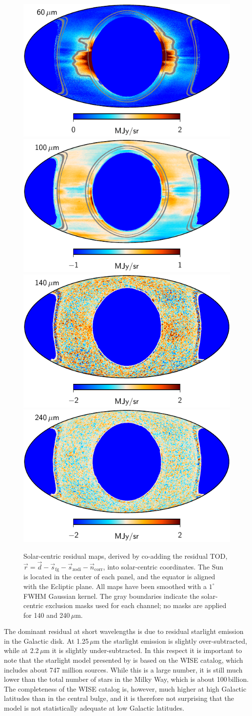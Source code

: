 \documentclass{aa}
\newcommand{\dv}[0]{\vec{d}}
\newcommand{\n}[0]{\vec{n}}
\newcommand{\s}[0]{\vec{s}}
\renewcommand{\r}[0]{\vec{r}}
\begin{document}
\begin{figure}
  \includegraphics[width=0.40\linewidth]{figs/solarmap_07_v2.pdf}\hspace*{5mm}
  \includegraphics[width=0.40\linewidth]{figs/solarmap_08_v2.pdf}\\
  \includegraphics[width=0.40\linewidth]{figs/solarmap_09_v2.pdf}\hspace*{5mm}
  \includegraphics[width=0.40\linewidth]{figs/solarmap_10_v2.pdf}
  \caption{Solar-centric residual maps, derived by co-adding the residual TOD, $\r = \dv - \s_{\mathrm{fg}} - \s_{\mathrm{zodi}} - \n_{\mathrm{corr}}$, into solar-centric coordinates. The Sun is located in the center of each panel, and the equator is aligned with the Ecliptic plane. All maps have been smoothed with a $1^{\circ}$ FWHM Gaussian kernel. The gray boundaries indicate the solar-centric exclusion masks used for each channel; no masks are applied for 140 and 240\,$\mu$m.}
  \label{fig:solarmaps}
\end{figure}

The dominant residual at short wavelengths is due to
residual starlight emission in the Galactic disk. At 1.25$\,\mu$m the starlight emission is
slightly over-subtracted, while at 2.2\,$\mu$m it is slightly
under-subtracted. In this respect it is important to note that the
starlight model presented by \citet{CG02_04} is based on the WISE
catalog, which includes about 747 million sources. While this is a
large number, it is still much lower than the total number of stars in
the Milky Way, which is about 100\,billion. The completeness of the
WISE catalog is, however, much higher at high Galactic latitudes than
in the central bulge, and it is therefore not surprising that the
model is not statistically adequate at low Galactic latitudes. 
       
\end{document}
